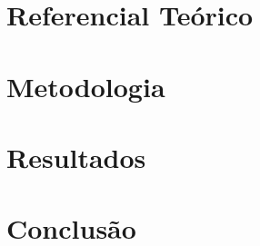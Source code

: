 \documentclass[12pt, a4paper, twoside]{article}
\numberwithin{equation}{subsection} %
\begin{document}
\newpage
%

\newpage

\section{\textbf{Referencial Teórico}}


\newpage



\section{\textbf{Metodologia}}


\newpage

%

\newpage
\section{\textbf{Resultados}}


\newpage

\section{\textbf{Conclusão}}

%
%
%




%
%
%
%
\end{document}

